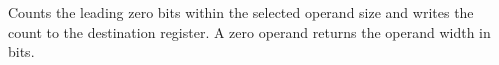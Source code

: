 Counts the leading zero bits within the selected operand size and writes the count to the destination register. A zero operand returns the operand width in bits.
